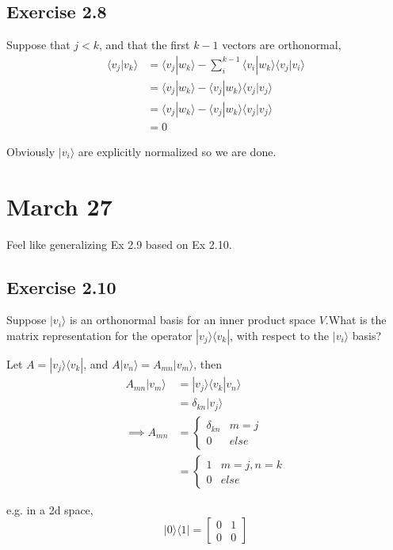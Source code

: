 \documentclass[]{article}
\begin{document}
\subsection{Exercise 2.8}

Suppose that $j < k$, and that the first $k-1$ vectors are orthonormal,
\begin{align*}
\langle v_j| v_k\rangle
&= \langle v_j|w_k\rangle - \sum_i^{k-1}\langle v_i | w_k\rangle \langle v_j|v_i\rangle \\
&= \langle v_j|w_k\rangle - \langle v_j | w_k\rangle \langle v_j|v_j\rangle \\
&= \langle v_j|w_k\rangle - \langle v_j | w_k\rangle \langle v_j|v_j\rangle \\
&= 0
\end{align*}

Obviously $|v_i\rangle$ are explicitly normalized so we are done.

\section{March 27}

Feel like generalizing Ex 2.9 based on Ex 2.10.

\subsection{Exercise 2.10}

Suppose $|v_i\rangle$ is an orthonormal basis for an inner product space $V$.What is the matrix representation for the operator $|v_j\rangle\langle v_k|$, with respect to the $|v_i\rangle$ basis?

Let $A = |v_j\rangle\langle v_k|$, and $A|v_n\rangle = A_{mn}|v_m\rangle$, then
\begin{align*}
A_{mn}|v_m\rangle
&= |v_j\rangle \langle v_k|v_n\rangle \\
&= \delta_{kn}|v_j\rangle \\
\implies A_{mn}
&= \begin{cases}
\delta_{kn} & m = j \\
0 & else
\end{cases} \\
&= \begin{cases}
1 & m = j, n = k \\
0 & else
\end{cases}
\end{align*}

e.g. in a 2d space,
\[|0\rangle\langle 1| = \left[\begin{matrix}
0 & 1 \\
0 & 0
\end{matrix}\right]\]
\end{document}
